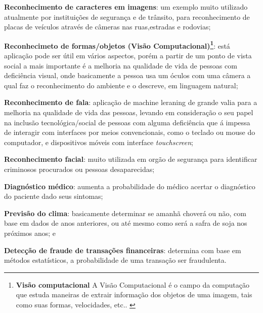  \begin{alineas}
	\item \textbf{Reconhecimento de caracteres em imagens}: um exemplo muito utilizado atualmente por instituições de segurança e de trânsito, para 
	reconhecimento de placas de veículos através de câmeras nas ruas,estradas e rodovias;


	\item \textbf{Reconhecimeto de formas/objetos (Visão Computacional)\footnote{\textbf{Visão computacional} A Visão Computacional é o campo da computação que estuda
maneiras de extrair informação dos objetos de uma imagem, tais como suas
formas, velocidades, etc.. \cite{vscomp}}}: está aplicação pode ser útil em vários aspectos, porém a partir de um ponto de vista social a mais importante 
	é a melhoria na qualidade de vida de pessoas com deficiência visual, onde basicamente a pessoa usa um óculos com uma câmera a qual faz o reconhecimento do ambiente
	e o descreve, em linguagem natural;


	\item \textbf{Reconhecimento de fala}: aplicação de machine leraning de grande valia para a melhoria na qualidade de vida das pessoas,
	levando em consideração o seu papel na inclusão tecnológica/social de pessoas com alguma deficiência que á impessa de interagir 
	com interfaces por meios convencionais, como o teclado ou  mouse do computador, e dispositivos móveis com interface \textit{touchscreen};
	
	
	\item \textbf{Reconhecimento facial}: muito utilizada em orgão de segurança para identificar criminosos procurados ou pessoas desaparecidas;
	
	
	\item \textbf{Diagnóstico médico}: aumenta a probabilidade do médico acertar o diagnóstico do paciente dado seus sintomas;   
	
	
	\item \textbf{Previsão do clima}: basicamente determinar se amanhã choverá ou não, com base em dados de anos anteriores, ou até mesmo como será a 
	safra de soja nos próximos anos; e 
	
	
	\item \textbf{Detecção de fraude de transações financeiras}: determina com base em métodos estatísticos, a probabilidade de uma transação ser fraudulenta.
 \end{alineas}

